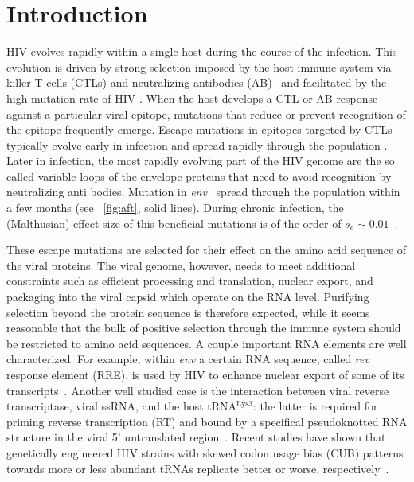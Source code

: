 \documentclass[rmp, twocolumn]{revtex4}
\newcommand{\env}{\textit{env}}
\newcommand{\rev}{\textit{rev}}
\begin{document}
\maketitle

\section{Introduction}

HIV evolves rapidly within a single host during the course of the infection. This evolution is driven by strong selection imposed by the host immune system via killer T cells (CTLs) and neutralizing antibodies (AB)~\citep{pantaleo_immunopathogenesis_1996} and facilitated by the high mutation rate of HIV \citep{mansky}.
When the host develops a CTL or AB response against a particular viral epitope, mutations that reduce or prevent recognition of the epitope frequently emerge. Escape mutations in epitopes targeted by CTLs typically evolve early in infection and spread rapidly through the population \citep{McMichael}. Later in infection, the most rapidly evolving part of the HIV genome are the so called variable loops of the envelope proteins that need to avoid recognition by neutralizing anti bodies. Mutation in \env~ spread through the population within a few months (see \figurename~\ref{fig:aft}, solid lines). During chronic infection, the (Malthusian) effect size of this beneficial
mutations is of the order of $s_e \sim 0.01$~\citep{neher_recombination_2010}.

These escape mutations are selected for their effect on the amino acid sequence of the viral proteins. The viral genome, however, needs to meet additional constraints such as efficient processing and translation, nuclear export, and packaging into the viral capsid which operate on the RNA level. Purifying selection beyond the protein sequence is therefore expected, while it seems reasonable that the bulk of positive selection through the immune system should be restricted to amino acid sequences. A couple important RNA elements  are well characterized. For example, within \env{} a certain RNA sequence, called \rev{} response element (RRE), is used by HIV to enhance
nuclear export of some of its transcripts~\citep{fernandes_hiv-1_2012}. Another
well studied case is the interaction between viral reverse transcriptase, viral
ssRNA, and the host tRNA$^\text{Lys3}$: the latter is required for priming
reverse transcription (RT) and bound by a specifical pseudoknotted RNA structure
in the viral 5' untranslated region~\citep{barat_interaction_1991,
paillart_vitro_2002}. Recent studies
have shown that genetically engineered HIV strains with skewed codon usage bias
(CUB) patterns towards more or less abundant tRNAs replicate better or worse,
respectively~\citep{ngumbela_quantitative_2008, li_codon-usage-based_2012}. 
\end{document}
